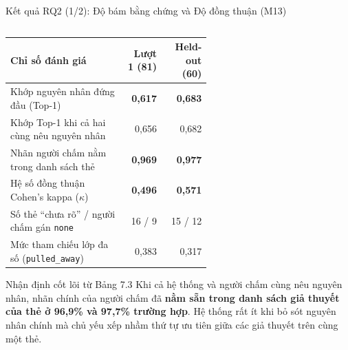 \begin{frame}{Kết quả RQ2 (1/2): Độ bám bằng chứng và Độ đồng thuận (M13)}
\begin{columns}[T,onlytextwidth]
\begin{column}{0.49\textwidth}
\begin{tabular}{L{0.58\linewidth}|r|r}
        \textbf{Chỉ số đánh giá} & \textbf{Lượt 1 (81)} & \textbf{Held-out (60)} \\
        \hline
        Khớp nguyên nhân đứng đầu (Top-1) & \textbf{0,617} & \alert{\textbf{0,683}} \\
        Khớp Top-1 khi cả hai cùng nêu nguyên nhân & 0,656 & 0,682 \\
        \alert{Nhãn người chấm nằm trong danh sách thẻ} & \alert{\textbf{0,969}} & \alert{\textbf{0,977}} \\
        Hệ số đồng thuận Cohen's kappa ($\kappa$) & \textbf{0,496} & \alert{\textbf{0,571}} \\
        Số thẻ ``chưa rõ'' / người chấm gán \texttt{none} & 16 / 9 & 15 / 12 \\
        Mức tham chiếu lớp đa số (\texttt{pulled\_away}) & 0,383 & 0,317 \\
      \end{tabular}
      \vspace{0.06cm}
      \begin{alertblock}{Nhận định cốt lõi từ Bảng 7.3}
        Khi cả hệ thống và người chấm cùng nêu nguyên nhân, nhãn chính của người chấm đã \textbf{nằm sẵn trong danh sách giả thuyết của thẻ ở 96,9\% và 97,7\% trường hợp}. Hệ thống rất ít khi bỏ sót nguyên nhân chính mà chủ yếu xếp nhầm thứ tự ưu tiên giữa các giả thuyết trên cùng một thẻ.
      \end{alertblock}
    \end{column}
  \end{columns}
\end{frame}

